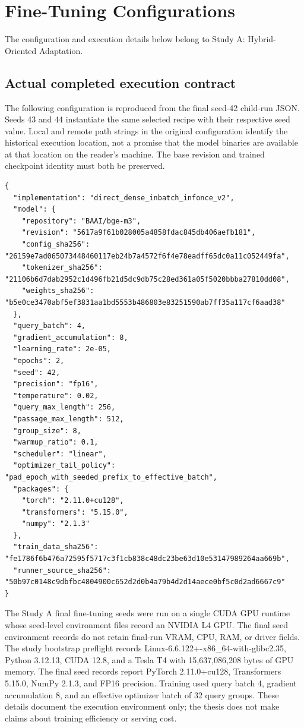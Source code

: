 \chapter{Fine-Tuning Configurations}

The configuration and execution details below belong to Study A: Hybrid-Oriented Adaptation.
\section{Actual completed execution contract}

The following configuration is reproduced from the final seed-42 child-run JSON. Seeds 43 and 44 instantiate the same selected recipe with their respective seed value. Local and remote path strings in the original configuration identify the historical execution location, not a promise that the model binaries are available at that location on the reader's machine. The base revision and trained checkpoint identity must both be preserved.

\begin{Verbatim}[fontsize=\footnotesize,breaklines=true,breakanywhere=true]
{
  "implementation": "direct_dense_inbatch_infonce_v2",
  "model": {
    "repository": "BAAI/bge-m3",
    "revision": "5617a9f61b028005a4858fdac845db406aefb181",
    "config_sha256": "26159e7ad065073448460117eb24b7a4572f6f4e78eadff65dc0a11c052449fa",
    "tokenizer_sha256": "21106b6d7dab2952c1d496fb21d5dc9db75c28ed361a05f5020bbba27810dd08",
    "weights_sha256": "b5e0ce3470abf5ef3831aa1bd5553b486803e83251590ab7ff35a117cf6aad38"
  },
  "query_batch": 4,
  "gradient_accumulation": 8,
  "learning_rate": 2e-05,
  "epochs": 2,
  "seed": 42,
  "precision": "fp16",
  "temperature": 0.02,
  "query_max_length": 256,
  "passage_max_length": 512,
  "group_size": 8,
  "warmup_ratio": 0.1,
  "scheduler": "linear",
  "optimizer_tail_policy": "pad_epoch_with_seeded_prefix_to_effective_batch",
  "packages": {
    "torch": "2.11.0+cu128",
    "transformers": "5.15.0",
    "numpy": "2.1.3"
  },
  "train_data_sha256": "fe1786f6b476a72595f5717c3f1cb838c48dc23be63d10e53147989264aa669b",
  "runner_source_sha256": "50b97c0148c9dbfbc4804900c652d2d0b4a79b4d2d14aece0bf5c0d2ad6667c9"
}
\end{Verbatim}

The Study A final fine-tuning seeds were run on a single CUDA GPU runtime whose seed-level environment files record an NVIDIA L4 GPU. The final seed environment records do not retain final-run VRAM, CPU, RAM, or driver fields. The study bootstrap preflight records Linux-6.6.122+-x86\_64-with-glibc2.35, Python 3.12.13, CUDA 12.8, and a Tesla T4 with 15,637,086,208 bytes of GPU memory. The final seed records report PyTorch 2.11.0+cu128, Transformers 5.15.0, NumPy 2.1.3, and FP16 precision. Training used query batch 4, gradient accumulation 8, and an effective optimizer batch of 32 query groups. These details document the execution environment only; the thesis does not make claims about training efficiency or serving cost.

